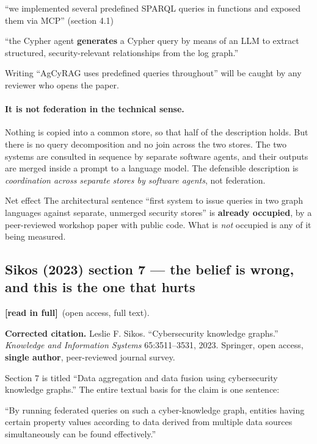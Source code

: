 \documentclass[11pt,a4paper]{article}
\newcommand{\readtag}{\textcolor{standing}{\textbf{[read in full]}}}
\begin{document}
\begin{quotebox}
``we implemented several predefined SPARQL queries in functions and exposed them
via MCP'' \hfill (section 4.1)

\vspace{3pt}
``the Cypher agent \textbf{generates} a Cypher query by means of an LLM to extract
structured, security-relevant relationships from the log graph.''
\end{quotebox}

Writing ``AgCyRAG uses predefined queries throughout'' will be caught by any
reviewer who opens the paper.

\paragraph{It is not federation in the technical sense.} Nothing is copied into a
common store, so that half of the description holds. But there is no query
decomposition and no join across the two stores. The two systems are consulted in
sequence by separate software agents, and their outputs are merged inside a prompt
to a language model. The defensible description is \emph{coordination across
separate stores by software agents}, not federation.

\begin{keybox}{Net effect}
The architectural sentence ``first system to issue queries in two graph languages
against separate, unmerged security stores'' is \textbf{already occupied}, by a
peer-reviewed workshop paper with public code. What is \emph{not} occupied is any
of it being measured.
\end{keybox}

\subsection{Sikos (2023) section 7 --- the belief is wrong, and this is the one that hurts}

\readtag\ (open access, full text).

\textbf{Corrected citation.} Leslie F. Sikos. ``Cybersecurity knowledge graphs.''
\emph{Knowledge and Information Systems} 65:3511--3531, 2023. Springer, open
access, \textbf{single author}, peer-reviewed journal survey.

Section 7 is titled ``Data aggregation and data fusion using cybersecurity
knowledge graphs.'' The entire textual basis for the claim is one sentence:

\begin{quotebox}
``By running federated queries on such a cyber-knowledge graph, entities having
certain property values according to data derived from multiple data sources
simultaneously can be found effectively.''
\end{quotebox}
\end{document}
